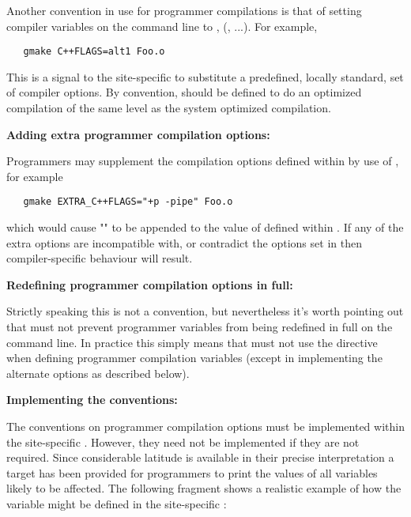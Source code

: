 Another convention in use for programmer compilations is that of setting
compiler  variables on the command line to ,
(, ...).  For example,

\begin{verbatim}
   gmake C++FLAGS=alt1 Foo.o
\end{verbatim}

\noindent
This is a signal to the site-specific  to substitute a
predefined, locally standard, set of compiler options.  By convention,
 should be defined to do an optimized compilation of the same level
as the system optimized compilation.

\textbf{Adding extra programmer compilation options:}

Programmers may supplement the compilation options defined within
 by use of , for example

\begin{verbatim}
   gmake EXTRA_C++FLAGS="+p -pipe" Foo.o
\end{verbatim}

\noindent
which would cause "" to be appended to the value of
 defined within .  If any of the extra options
are incompatible with, or contradict the options set in  then
compiler-specific behaviour will result.

\textbf{Redefining programmer compilation options in full:}

Strictly speaking this is not a  convention, but nevertheless
it's worth pointing out that  must not prevent programmer
variables from being redefined in full on the  command line.  In
practice this simply means that  must not use the
 directive when defining programmer compilation variables
(except in implementing the alternate options as described below).

\textbf{Implementing the conventions:}

The conventions on programmer compilation options must be implemented within
the site-specific .  However, they need not be implemented if
they are not required.  Since considerable latitude is available in their
precise interpretation a  target has been provided for
programmers to print the values of all variables likely to be affected.  The
following fragment shows a realistic example of how the 
variable might be defined in the site-specific :

